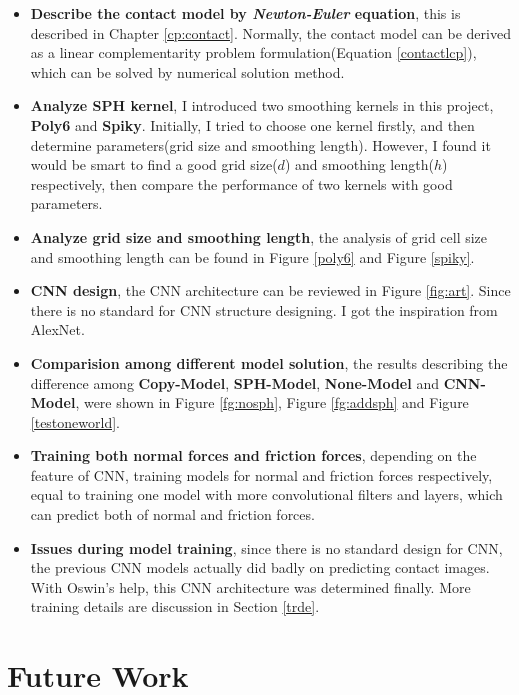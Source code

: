 \begin{itemize}
    \item \textbf{Describe the contact model by \textit{Newton-Euler} equation}, this is described in Chapter \ref{cp:contact}. Normally, the contact model can be derived as a linear complementarity problem formulation(Equation \ref{contactlcp}), which can be solved by numerical solution method.
    \item \textbf{Analyze SPH kernel}, I introduced two smoothing kernels in this project, \textbf{Poly6} and \textbf{Spiky}. Initially, I tried to choose one kernel firstly, and then determine parameters(grid size and smoothing length). However, I found it would be smart to find a good grid size($d$) and smoothing length($h$) respectively, then compare the performance of two kernels with good parameters.  
    \item \textbf{Analyze grid size and smoothing length}, the analysis of grid cell size and smoothing length can be found in Figure \ref{poly6} and Figure \ref{spiky}.
    \item \textbf{CNN design}, the CNN architecture can be reviewed in Figure \ref{fig:art}. Since there is no standard for CNN structure designing. I got the inspiration from AlexNet.
    \item \textbf{Comparision among different model solution}, the results describing the difference among \textbf{Copy-Model}, \textbf{SPH-Model}, \textbf{None-Model} and \textbf{CNN-Model}, were shown in Figure \ref{fg:nosph}, Figure \ref{fg:addsph} and Figure \ref{testoneworld}.
    \item \textbf{Training both normal forces and friction forces}, depending on the feature of CNN, training models for normal and friction forces respectively, equal to training one model with more convolutional filters and layers, which can predict both of normal and friction forces.
    \item \textbf{Issues during model training}, since there is no standard design for CNN, the previous CNN models actually did badly on predicting contact images. With Oswin's help, this CNN architecture was determined finally. More training details are discussion in Section \ref{trde}. 
\end{itemize}

\section{Future Work}
